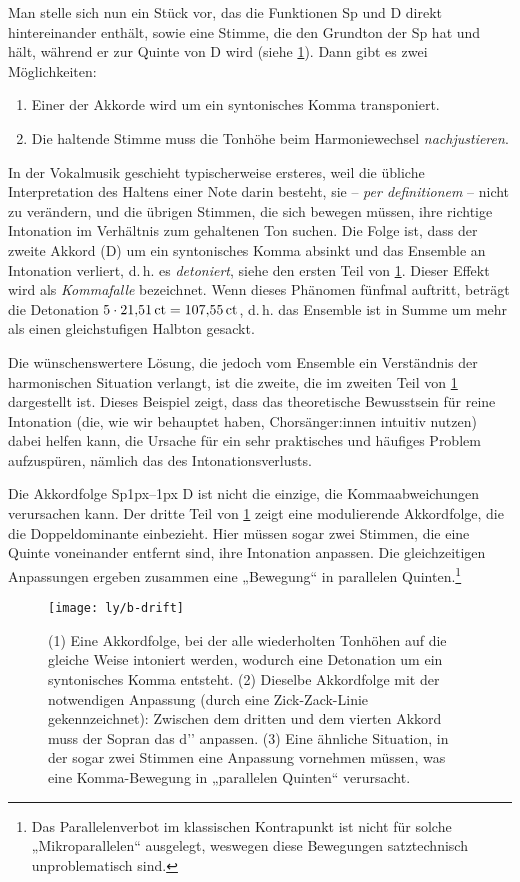 Man stelle sich nun ein Stück vor, das die Funktionen Sp und D direkt
hintereinander enthält, sowie eine Stimme, die den Grundton der Sp hat und hält,
während er zur Quinte von D wird (siehe \cref{fig:drift}). Dann gibt es
zwei Möglichkeiten:

\begin{enumerate}[itemsep=0em]
\item Einer der Akkorde wird um ein syntonisches Komma transponiert.
\item Die haltende Stimme muss die Tonhöhe beim Harmoniewechsel 
  \emph{nachjustieren}.
\end{enumerate}%
%
In der Vokalmusik geschieht typischerweise ersteres, weil die übliche
Interpretation des Haltens einer Note darin besteht, sie – \emph{per
  definitionem} – nicht zu verändern, und die übrigen Stimmen, die sich bewegen
müssen, ihre richtige Intonation im Verhältnis zum gehaltenen Ton suchen. Die
Folge ist, dass der zweite Akkord (D) um ein syntonisches Komma absinkt
und das Ensemble an Intonation verliert, d.\,h. es \emph{detoniert}, siehe den
ersten Teil von \cref{fig:drift}. Dieser Effekt wird als \emph{Kommafalle}
bezeichnet. Wenn dieses Phänomen fünfmal auftritt, beträgt die Detonation
$5\cdot 21{,}51\,\mathrm{ct}=107{,}55\,\mathrm{ct}$, d.\,h. das Ensemble ist in Summe um
mehr als einen gleichstufigen Halbton gesackt.

Die wünschenswertere Lösung, die jedoch vom Ensemble ein Verständnis der
harmonischen Situation verlangt, ist die zweite, die im zweiten Teil von
\cref{fig:drift} dargestellt ist. Dieses Beispiel zeigt, dass das theoretische
Bewusstsein für reine Intonation (die, wie wir behauptet haben, Chorsänger:innen
intuitiv nutzen) dabei helfen kann, die Ursache für ein sehr praktisches und
häufiges Problem aufzuspüren, nämlich das des Intonationsverlusts.

Die Akkordfolge Sp\kern1px–\kern1px D ist nicht die einzige, die
Kommaabweichungen verursachen kann. Der dritte Teil von \cref{fig:drift} zeigt
eine modulierende Akkordfolge, die die Doppeldominante einbezieht. Hier müssen
sogar zwei Stimmen, die eine Quinte voneinander entfernt sind, ihre Intonation
anpassen. Die gleichzeitigen An\-passungen ergeben zusammen eine „Bewegung“ in
parallelen Quinten.\footnote{Das Parallelenverbot im klassischen Kontrapunkt ist
  nicht für solche „Mikroparallelen“ ausgelegt, weswegen diese Bewegungen
  satztechnisch unproblematisch sind.}

\begin{figure}
  \centering
  \texttt{[image: ly/b-drift]}
  \caption{(1) Eine Akkordfolge, bei der alle wiederholten Tonhöhen auf die   
  	gleiche Weise intoniert werden, wodurch eine Detonation um ein syntonisches
  	Komma entsteht. %
  	(2) Dieselbe Akkordfolge mit der notwendigen Anpassung (durch eine
  	Zick-Zack-Linie gekennzeichnet): Zwischen dem dritten und dem vierten Akkord
  	muss der Sopran das d’’ anpassen. %
  	(3) Eine ähnliche Situation, in der sogar zwei Stimmen eine Anpassung
  	vornehmen müssen, was eine Komma-Bewegung in „parallelen Quinten“
  	verursacht.}\label{fig:drift}
\end{figure}

